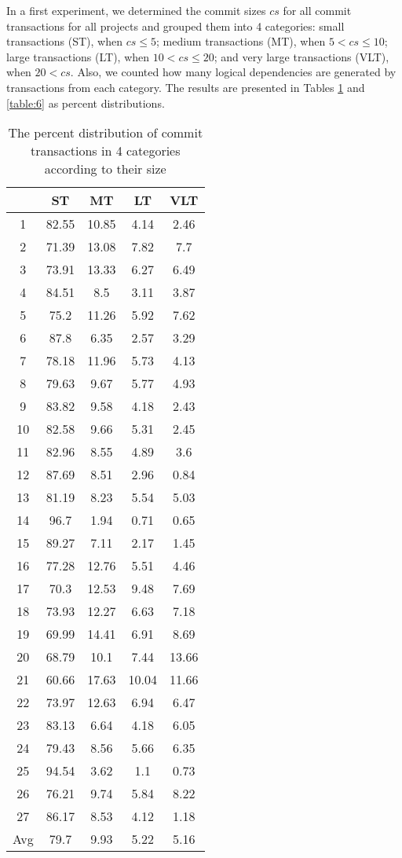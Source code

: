 \documentclass[a4paper,twoside]{article}
\begin{document}
In a first experiment, we determined the commit sizes $cs$ for all commit transactions for all projects and grouped them into 4 categories: small transactions (ST), when 	$cs\leq 5$; medium transactions (MT), when 	$5 < cs\leq 10$; large transactions (LT), when 	$10 < cs\leq 20$; and very large transactions (VLT), when 	$20 < cs$. Also, we counted how many logical dependencies are generated by transactions  from each category. The results are presented in Tables \ref{table:5} and \ref{table:6} as percent distributions.


\begin{table}[!h]
\renewcommand{\arraystretch}{1}
\caption{The percent distribution of commit transactions in 4 categories according to their size}


\label{table:5}
\centering
\begin{tabular}{|c|c|c|c|c|}
\hline
   &	ST	&	 MT	&	LT	&	VLT	\\
\hline
1	&	82.55	&	10.85	&	4.14	&	2.46	\\
2	&	71.39	&	13.08	&	7.82	&	7.7	\\
3	&	73.91	&	13.33	&	6.27	&	6.49	\\
4	&	84.51	&	8.5	&	3.11	&	3.87	\\
5	&	75.2	&	11.26	&	5.92	&	7.62	\\
6	&	87.8	&	6.35	&	2.57	&	3.29	\\
7	&	78.18	&	11.96	&	5.73	&	4.13	\\
8	&	79.63	&	9.67	&	5.77	&	4.93	\\
9	&	83.82	&	9.58	&	4.18	&	2.43	\\
10	&	82.58	&	9.66	&	5.31	&	2.45	\\
11	&	82.96	&	8.55	&	4.89	&	3.6	\\
12	&	87.69	&	8.51	&	2.96	&	0.84	\\
13	&	81.19	&	8.23	&	5.54	&	5.03	\\
14	&	96.7	&	1.94	&	0.71	&	0.65	\\
15	&	89.27	&	7.11	&	2.17	&	1.45	\\
16	&	77.28	&	12.76	&	5.51	&	4.46	\\
17	&	70.3	&	12.53	&	9.48	&	7.69	\\
18	&	73.93	&	12.27	&	6.63	&	7.18	\\
19	&	69.99	&	14.41	&	6.91	&	8.69	\\
20	&	68.79	&	10.1	&	7.44	&	13.66	\\
21	&	60.66	&	17.63	&	10.04	&	11.66	\\
22	&	73.97	&	12.63	&	6.94	&	6.47	\\
23	&	83.13	&	6.64	&	4.18	&	6.05	\\
24	&	79.43	&	8.56	&	5.66	&	6.35	\\
25	&	94.54	&	3.62	&	1.1	&	0.73	\\
26	&	76.21	&	9.74	&	5.84	&	8.22	\\
27	&	86.17	&	8.53	&	4.12	&	1.18	\\
\hline
Avg	&	79.7	&	9.93	&	5.22	&	5.16	\\
\hline
\end{tabular}
\end{table}
\end{document}
